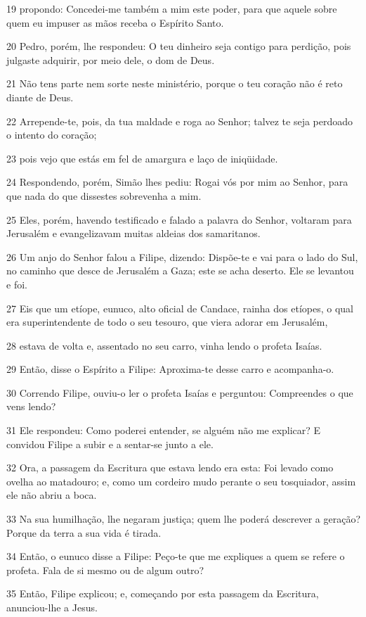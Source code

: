 \par 19 propondo: Concedei-me também a mim este poder, para que aquele sobre quem eu impuser as mãos receba o Espírito Santo.
\par 20 Pedro, porém, lhe respondeu: O teu dinheiro seja contigo para perdição, pois julgaste adquirir, por meio dele, o dom de Deus.
\par 21 Não tens parte nem sorte neste ministério, porque o teu coração não é reto diante de Deus.
\par 22 Arrepende-te, pois, da tua maldade e roga ao Senhor; talvez te seja perdoado o intento do coração;
\par 23 pois vejo que estás em fel de amargura e laço de iniqüidade.
\par 24 Respondendo, porém, Simão lhes pediu: Rogai vós por mim ao Senhor, para que nada do que dissestes sobrevenha a mim.
\par 25 Eles, porém, havendo testificado e falado a palavra do Senhor, voltaram para Jerusalém e evangelizavam muitas aldeias dos samaritanos.
\par 26 Um anjo do Senhor falou a Filipe, dizendo: Dispõe-te e vai para o lado do Sul, no caminho que desce de Jerusalém a Gaza; este se acha deserto. Ele se levantou e foi.
\par 27 Eis que um etíope, eunuco, alto oficial de Candace, rainha dos etíopes, o qual era superintendente de todo o seu tesouro, que viera adorar em Jerusalém,
\par 28 estava de volta e, assentado no seu carro, vinha lendo o profeta Isaías.
\par 29 Então, disse o Espírito a Filipe: Aproxima-te desse carro e acompanha-o.
\par 30 Correndo Filipe, ouviu-o ler o profeta Isaías e perguntou: Compreendes o que vens lendo?
\par 31 Ele respondeu: Como poderei entender, se alguém não me explicar? E convidou Filipe a subir e a sentar-se junto a ele.
\par 32 Ora, a passagem da Escritura que estava lendo era esta: Foi levado como ovelha ao matadouro; e, como um cordeiro mudo perante o seu tosquiador, assim ele não abriu a boca.
\par 33 Na sua humilhação, lhe negaram justiça; quem lhe poderá descrever a geração? Porque da terra a sua vida é tirada.
\par 34 Então, o eunuco disse a Filipe: Peço-te que me expliques a quem se refere o profeta. Fala de si mesmo ou de algum outro?
\par 35 Então, Filipe explicou; e, começando por esta passagem da Escritura, anunciou-lhe a Jesus.
